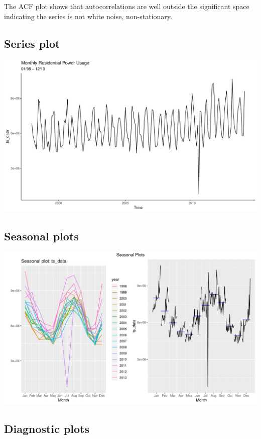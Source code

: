 \documentclass[openany]{book}
\begin{document}
The ACF plot shows that autocorrelations are well outside the
significant space indicating the series is not white noise,
non-stationary.

\subsection{Series plot}\label{series-plot}

\includegraphics{Part-B-AS_files/figure-latex/unnamed-chunk-1-1.pdf}

\subsection{Seasonal plots}\label{seasonal-plots}

\includegraphics{Part-B-AS_files/figure-latex/unnamed-chunk-2-1.pdf}

\subsection{Diagnostic plots}\label{diagnostic-plots}
\end{document}
